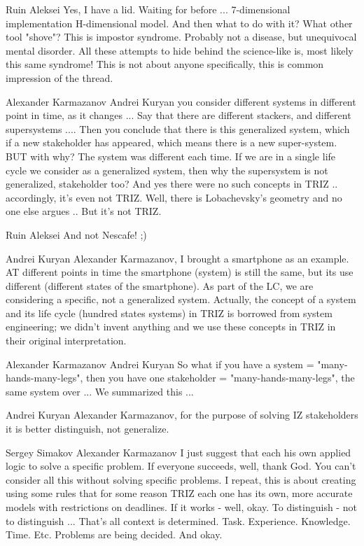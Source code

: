 \documentclass[11pt,a4paper]{article}
\begin{document}
Ruin Aleksei Yes, I have a lid. Waiting for before ... 7-dimensional
implementation H-dimensional model. And then what to do with it? What other
tool "shove"? This is impostor syndrome. Probably not a disease, but
unequivocal mental disorder. All these attempts to hide behind the
science-like is, most likely this same syndrome! This is not about anyone
specifically, this is common impression of the thread.

Alexander Karmazanov Andrei Kuryan you consider different systems in different
point in time, as it changes ... Say that there are different stackers, and
different supersystems .... Then you conclude that there is this generalized
system, which if a new stakeholder has appeared, which means there is a new
super-system. BUT with why? The system was different each time. If we are in a
single life cycle we consider as a generalized system, then why the
supersystem is not generalized, stakeholder too? And yes there were no such
concepts in TRIZ .. accordingly, it’s even not TRIZ. Well, there is
Lobachevsky’s geometry and no one else argues .. But it’s not TRIZ.

Ruin Aleksei And not Nescafe! ;)

Andrei Kuryan Alexander Karmazanov, I brought a smartphone as an example. AT
different points in time the smartphone (system) is still the same, but its
use different (different states of the smartphone). As part of the LC, we are
considering a specific, not a generalized system. Actually, the concept of a
system and its life cycle (hundred states systems) in TRIZ is borrowed from
system engineering; we didn’t invent anything and we use these concepts in
TRIZ in their original interpretation.

Alexander Karmazanov Andrei Kuryan So what if you have a system =
"many-hands-many-legs", then you have one stakeholder =
"many-hands-many-legs", the same system over ... We summarized this ...

Andrei Kuryan Alexander Karmazanov, for the purpose of solving IZ stakeholders
it is better distinguish, not generalize.

Sergey Simakov Alexander Karmazanov I just suggest that each his own applied
logic to solve a specific problem. If everyone succeeds, well, thank God. You
can’t consider all this without solving specific problems.  I repeat, this is
about creating using some rules that for some reason TRIZ each one has its
own, more accurate models with restrictions on deadlines. If it works - well,
okay. To distinguish - not to distinguish ... That's all context is
determined. Task. Experience. Knowledge. Time. Etc. Problems are being
decided. And okay.
\end{document}
